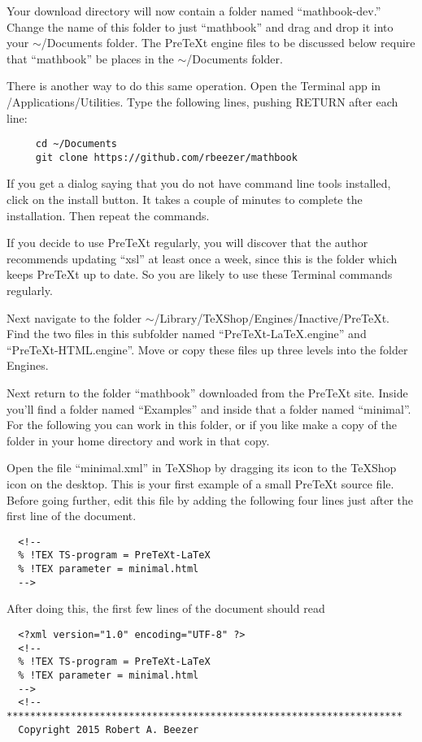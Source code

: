 \documentclass[11pt, oneside]{article}   	%
\begin{document}
Your download directory will now contain a folder named ``mathbook-dev.'' Change the name of this folder to just ``mathbook'' and drag and drop it into your $\sim$/Documents folder. The PreTeXt engine files to be discussed below require that ``mathbook'' be places in the $\sim$/Documents folder.

There is another way to do this same operation. Open the Terminal app in /Applications/Utilities. Type the following lines, pushing RETURN after each line:
\begin{verbatim}
     cd ~/Documents
     git clone https://github.com/rbeezer/mathbook
\end{verbatim}

If you get a dialog saying that you do not have command line tools installed, click on the install button. It takes a couple of minutes to complete the installation. Then repeat the commands.

If you decide to use PreTeXt regularly, you will discover that the author recommends updating ``xsl'' at least once a week, since this is the folder which keeps PreTeXt up to date. So you are likely to use these Terminal commands regularly.

Next navigate to the folder $\sim$/Library/TeXShop/Engines/Inactive/PreTeXt. Find the two files in this subfolder named ``PreTeXt-LaTeX.engine'' and ``PreTeXt-HTML.engine''. Move or copy these files up three levels into the folder Engines.


Next return to  the folder ``mathbook'' downloaded from the PreTeXt site. Inside you'll find a folder named ``Examples'' and inside that a folder named ``minimal''. For the following you can work in this folder, or if you like make a copy of the folder in your home directory and work in that copy.

Open the file ``minimal.xml'' in TeXShop by dragging its icon to the TeXShop icon on the desktop. This is your first example of a small PreTeXt source file. Before going further, edit this file by adding the following four lines just after the first line of the document.



\begin{verbatim}
  <!--
  % !TEX TS-program = PreTeXt-LaTeX
  % !TEX parameter = minimal.html
  -->
\end{verbatim}

After doing this, the first few lines of the document should read 
\begin{verbatim}
  <?xml version="1.0" encoding="UTF-8" ?>
  <!--
  % !TEX TS-program = PreTeXt-LaTeX
  % !TEX parameter = minimal.html
  -->
  <!--********************************************************************
  Copyright 2015 Robert A. Beezer
\end{verbatim}
\end{document}
